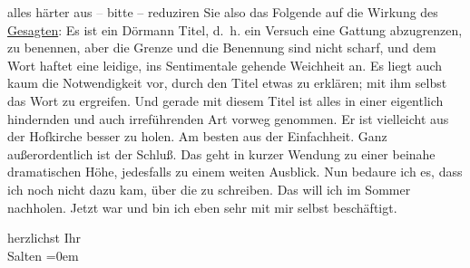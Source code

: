                alles härter aus \textcolor{gray}{–} bitte – reduziren Sie also das Folgende auf die
               Wirkung des \uline{Gesagten}: Es ist ein Dörmann Titel, d. h. ein Versuch eine Gattung abzugrenzen, zu
               benennen, aber die Grenze und die Benennung sind nicht scharf, und dem Wort haftet
               eine leidige, ins Sentimentale gehende Weichheit an. Es liegt auch kaum die
               Notwendigkeit vor, durch den Titel etwas zu erklären; mit ihm selbst das Wort zu
               ergreifen. Und gerade mit diesem Titel ist alles in einer eigentlich hindernden und
               auch irreführenden Art vorweg genommen. Er ist vielleicht aus der Hofkirche besser zu holen. Am besten aus der Einfachheit.
               Ganz außerordentlich ist der Schluß. Das geht in kurzer Wendung {\pb}zu einer beinahe dramatischen
               Höhe, jedesfalls zu einem weiten Ausblick. Nun bedaure ich es, dass ich noch nicht
               dazu kam, über die \label{K_L03330-4v}\label{K_L03330-4} zu schreiben. Das will
               ich im Sommer nachholen. Jetzt war und bin
               ich eben sehr mit mir selbst beschäftigt.\pend
           
\pstart
           herzlichst Ihr {\\[\baselineskip]}\spacefill\mbox{Salten}\pend
           \leftskip=0em{}\endnumbering{}  \newcommand{\dateiname}{L03330}\newcommand{\titel}{Felix Salten an Arthur Schnitzler, 22. 5. 1902}\newcommand{\editorInnen}{Martin Anton Müller und Laura Untner}
